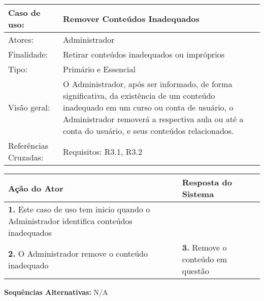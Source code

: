 \documentclass[12pt,a4paper,onecolumn,titlepage]{article}
\begin{document}
\begin{table}[h!]
\begin{center}
\begin{tabular}{p{2.5cm} p{9.5cm}}
Caso de uso: & \textbf{Remover Conteúdos Inadequados} \\ \hline
Atores: & Administrador \\ \hline
Finalidade: & Retirar conteúdos inadequados ou impróprios\\ \hline
Tipo: & Primário e Essencial \\ \hline
Visão geral: & O Administrador, após ser informado, de forma significativa, da existência de um conteúdo inadequado em um curso ou conta de usuário, o Administrador removerá a respectiva aula ou até a conta do usuário, e seus conteúdos relacionados. \\ \hline
Referências Cruzadas: & Requisitos: R3.1, R3.2\\ 

\end{tabular}
\end{center}
\end{table}

\begin{center}
\def\arraystretch{1.1}
\begin{tabular}{|p{6cm}|p{6cm}|}

\hline
\textbf{Ação do Ator} & \textbf{Resposta do Sistema} \\ \hline
\textbf{1.} Este caso de uso tem inicio quando o Administrador identifica conteúdos inadequados  & \\ \hline
\textbf{2.} O Administrador remove o conteúdo inadequado  & \textbf{3.} Remove o conteúdo em questão  \\ \hline
\end{tabular}
\end{center}

\textbf{Sequências Alternativas:} N/A

\newpage
\end{document}
